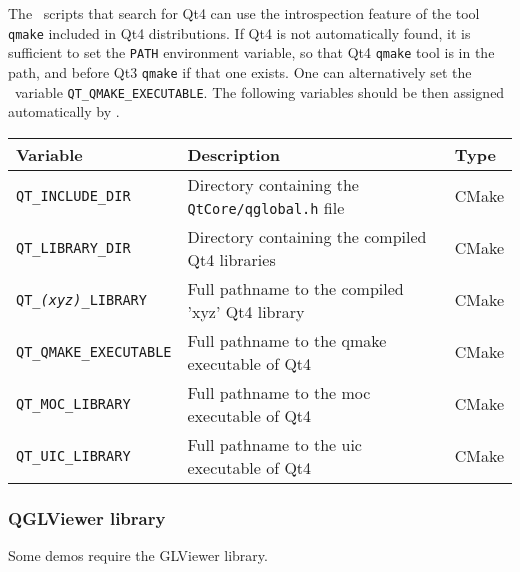 The \cmake\ scripts that search for Qt4 can use the introspection feature
of the tool \texttt{qmake} included in Qt4 distributions. If Qt4 is not
automatically found, it is sufficient to set the \texttt{PATH}
environment variable, so that Qt4 \texttt{qmake} tool is in the path, and
before Qt3 \texttt{qmake} if that one exists. One can alternatively set the
\cmake\ variable \texttt{QT\_QMAKE\_EXECUTABLE}. The following variables
should be then assigned automatically by \cmake{}.
{\ccTexHtml{\small}{}
\renewcommand{\arraystretch}{1.3}
\gdef\lcTabularBorder{2}
\begin{tabular}{|l|l|l|} \hline
  \textbf{Variable}                 & \textbf{Description}                                             & \textbf{Type}\\\hline\hline
  \texttt{QT\_INCLUDE\_DIR}         & Directory containing the \texttt{QtCore/qglobal.h} file          & CMake\\\hline
  \texttt{QT\_LIBRARY\_DIR}         & Directory containing the compiled Qt4 libraries                  & CMake\\\hline
  \texttt{QT\_{\em (xyz)}\_LIBRARY} & Full pathname to the compiled 'xyz' Qt4 library\footnotemark[17] & CMake\\\hline
  \texttt{QT\_QMAKE\_EXECUTABLE}    & Full pathname to the qmake executable of Qt4                     & CMake\\\hline
  \texttt{QT\_MOC\_LIBRARY}         & Full pathname to the moc executable of Qt4                       & CMake\\\hline
  \texttt{QT\_UIC\_LIBRARY}         & Full pathname to the uic executable of Qt4                       & CMake\\\hline
\end{tabular}
}
\addtocounter{footnote}{1}

\subsubsection{QGLViewer library}

Some demos require the GLViewer library.


